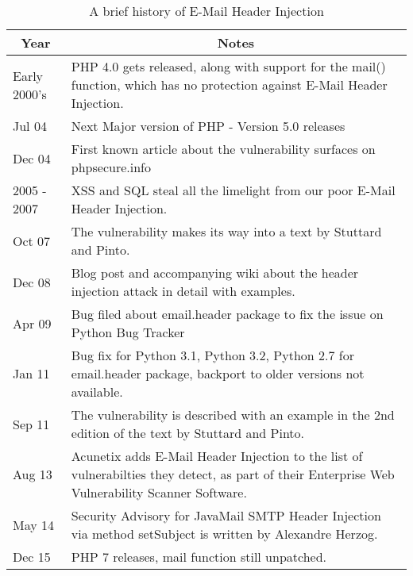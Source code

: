 \begin{table}[!htbp]
	\centering
	\begin{tabular}{|p{2cm}|p{12cm}|}
		\hline
		\multicolumn{1}{|c|}{\textbf{Year}} & \multicolumn{1}{c|}{\textbf{ Notes}}\\
		\hline

		{Early 2000's } & { PHP 4.0 gets released, along with support for the mail() function, which has no protection against E-Mail Header Injection.}\\
		\hline

		{Jul 04} & { Next Major version of PHP - Version 5.0 releases}\\
		\hline

		{Dec 04} & { First known article about the vulnerability surfaces on phpsecure.info}\\
		\hline

		{2005 - 2007} & {XSS and SQL steal all the limelight from our poor E-Mail Header Injection.}\\
		\hline

		{Oct 07} & {The vulnerability makes its way into a text by Stuttard and Pinto. }\\
		\hline

		{Dec 08} & {Blog post and accompanying wiki about the header injection attack in detail with examples.}\\
		\hline

		{Apr 09} & {Bug filed about email.header package to fix the issue on Python Bug Tracker}\\
		\hline

		{Jan 11} & {Bug fix for Python 3.1, Python 3.2, Python 2.7 for email.header package, backport to older versions not available.}\\
		\hline

		{Sep 11} & {The vulnerability is described with an example in the 2nd edition of the text by Stuttard and Pinto.}\\
		\hline

		{Aug 13} & {Acunetix adds E-Mail Header Injection to the list of vulnerabilties they detect, as part of their Enterprise Web Vulnerability Scanner Software.}\\
		\hline

		{May 14} & {Security Advisory for JavaMail SMTP Header Injection via method setSubject is written by Alexandre Herzog.}\\
		\hline

		{Dec 15}  & {PHP 7 releases, mail function still unpatched.}\\
		\hline
	\end{tabular}
	\caption{A brief history of E-Mail Header Injection}
	\label{tab:history}
\end{table}
